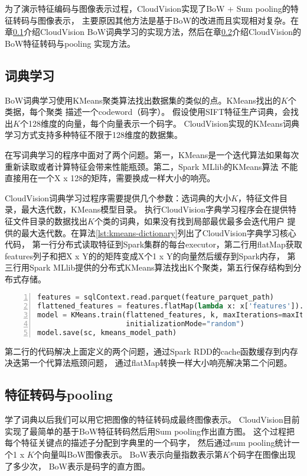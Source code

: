 为了演示特征编码与图像表示过程，CloudVision实现了BoW + Sum pooling的特征转码与图像表示，
主要原因其他方法是基于BoW的改进而且实现相对复杂。在章\ref{subsec:dict-learning}介绍CloudVision
BoW词典学习的实现方法，然后在章\ref{subsec:feature-encoding}介绍CloudVision的BoW特征转码与pooling
实现方法。

\subsection{词典学习}
\label{subsec:dict-learning}
BoW词典学习使用KMeans聚类算法找出数据集的类似的点。KMeans找出的$K$个类据，每个聚类
描述一个codeword（码字）。
假设使用SIFT特征生产词典，会找出$K$个128维度的向量，每个向量表示一个码字。
CloudVision实现的KMeans词典学习方式支持多种特征不限于128维度的数据集。

在写词典学习的程序中面对了两个问题。第一，KMeans是一个迭代算法如果每次
重新读取或者计算特征会带来性能瓶颈。第二，Spark MLlib的KMeans算法
不能直接用在一个X x 128的矩阵，需要换成一样大小的响亮。

CloudVision词典学习过程序需要提供几个参数：选词典的大小$K$，特征文件目录，最大迭代数，KMeans模型目录。
执行CloudVision字典学习程序会在提供特征文件目录的数据找出$K$个类的词典，如果没有找到局部最优最多会迭代用户
提供的最大迭代数。在算法\ref{lst:kmeans-dictionary}列出了CloudVision字典学习核心代码，
第一行分布式读取特征到Spark集群的每台executor，第二行用flatMap获取features列子和把X x Y的的矩阵变成X个1 x Y的向量然后缓存到Spark内存，
第三行用Spark MLlib提供的分布式KMeans算法找出K个聚类，第五行保存结构到分布式存储。
\begin{lstlisting}[language=Python,
                   basicstyle=\small,
                   showstringspaces=false,
                   numbers=left,
                   caption={词典学习核心代码},
                   label={lst:kmeans-dictionary}]
features = sqlContext.read.parquet(feature_parquet_path)
flattened_features = features.flatMap(lambda x: x['features']).cache()
model = KMeans.train(flattened_features, k, maxIterations=maxIter,
                     initializationMode="random")
model.save(sc, kmeans_model_path)
\end{lstlisting}
第二行的代码解决上面定义的两个问题，通过Spark RDD的cache函数缓存到内存决迭第一个代算法瓶颈问题，
通过flatMap转换一样大小响亮解决第二个问题。


\subsection{特征转码与pooling}
\label{subsec:feature-encoding}
学了词典以后我们可以用它把图像的特征转码成最终图像表示。
CloudVision目前实现了最简单的基于BoW特征转码然后用Sum pooling作出直方图。
这个过程把每个特征关键点的描述子分配到字典里的一个码字，
然后通过sum pooling统计一个1 x $K$个向量叫BoW图像表示。
BoW表示向量指数表示第$K$个码字在图像出现了多少次，
BoW表示是码字的直方图。

